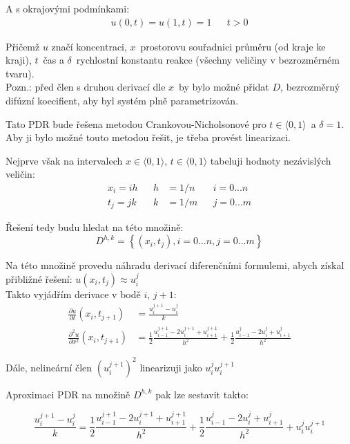 \documentclass[a4paper,12pt]{article}
\begin{document}
A s okrajovými podmínkami:
\begin{align}
	u(0,t) = u(1,t) = 1 && t > 0
\end{align}

Přičemž $u$ značí koncentraci, $x$~prostorovu souřadnici průměru (od kraje ke kraji), $t$~čas a $\delta$~rychlostní konstantu reakce (všechny veličiny v bezrozměrném tvaru).\\
Pozn.: před člen s druhou derivací dle $x$~by bylo možné přidat $D$, bezrozměrný difúzní koecifient, aby byl systém plně parametrizován.

Tato PDR bude řešena metodou Crankovou-Nicholsonové pro $t \in \langle0, 1\rangle$~a $\delta = 1$.
Aby ji bylo možné touto metodou řešit, je třeba provést linearizaci.

Nejprve však na intervalech $x \in \langle0, 1\rangle$, $t \in \langle0, 1\rangle$ tabeluji hodnoty nezávislých veličin:
\begin{align}
	x_i = i h && h &= 1/n && i = 0...n
	\\
	t_j = j k && k &= 1/m && j = 0...m
\end{align}

Řešení tedy budu hledat na této množině:
\begin{equation}
	D^{h,k} = \left\{ (x_i, t_j), i = 0...n, j = 0...m \right\}
\end{equation}

Na této množině provedu náhradu derivací diferenčními formulemi, abych získal přibližné řešení: $u(x_i, t_j) \approx u_i^j$ \\
Takto vyjádřím derivace v bodě $i$, $j+1$:
\begin{align}
	\frac{\partial u}{\partial t}(x_i, t_{j+1}) &=
	\frac{u_i^{j+1} - u_i^j}{k}
	\\
	\frac{\partial^2 u}{\partial x^2}(x_i, t_{j+1}) &=
	\frac{1}{2} \frac{u_{i-1}^{j+1} - 2 u_i^{j+1} + u_{i+1}^{j+1}}{h^2} +
	\frac{1}{2} \frac{u_{i-1}^j - 2 u_i^j + u_{i+1}^j}{h^2}
\end{align}

Dále, nelineární člen $(u_{i}^{j+1})^2$ linearizuji jako $u_{i}^{j} u_{i}^{j+1}$

Aproximaci PDR na množině $D^{h,k}$ pak lze sestavit takto:

\begin{equation}
	\frac{u_i^{j+1} - u_i^j}{k} =
	\frac{1}{2} \frac{u_{i-1}^{j+1} - 2 u_i^{j+1} + u_{i+1}^{j+1}}{h^2} +
	\frac{1}{2} \frac{u_{i-1}^j - 2 u_i^j + u_{i+1}^j}{h^2} +
	u_{i}^{j} u_{i}^{j+1}
\end{equation}
\end{document}
